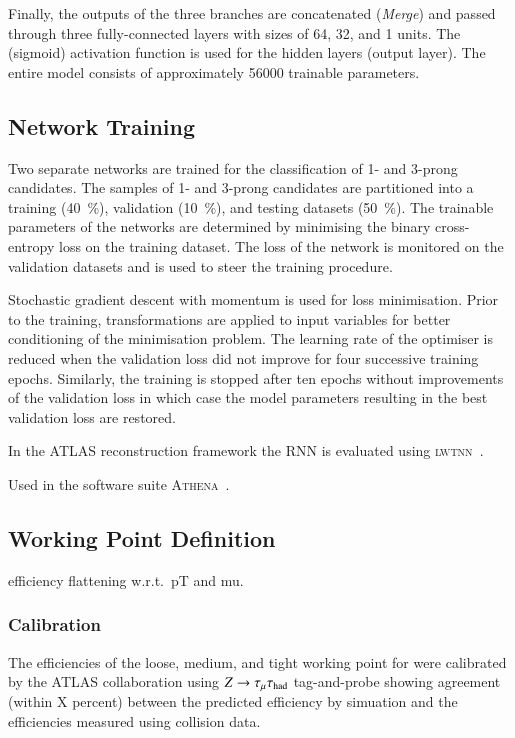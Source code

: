 Finally, the outputs of the three branches are concatenated
(\emph{Merge}) and passed through three fully-connected layers with
sizes of 64, 32, and 1 units. The \ReLU (sigmoid) activation function
is used for the hidden layers (output layer). The entire model
consists of approximately \num{56000} trainable parameters.


\subsection{Network Training}

Two separate networks are trained for the classification of 1- and
3-prong \tauhadvis candidates. The samples of 1- and 3-prong
\tauhadvis candidates are partitioned into a training
(\SI{40}{\percent}), validation (\SI{10}{\percent}), and testing
datasets (\SI{50}{\percent}). The trainable parameters of the networks
are determined by minimising the binary cross-entropy loss on the
training dataset. The loss of the network is monitored on the
validation datasets and is used to steer the training procedure.

Stochastic gradient descent with momentum is used for loss
minimisation. Prior to the training, transformations are applied to
input variables for better conditioning of the minimisation
problem. The learning rate of the optimiser is reduced when the
validation loss did not improve for four successive training
epochs. Similarly, the training is stopped after ten epochs without
improvements of the validation loss in which case the model parameters
resulting in the best validation loss are restored.

In the ATLAS reconstruction framework the RNN \tauid is evaluated
using \textsc{lwtnn}~\cite{lwtnn}.

Used in the software suite
\textsc{Athena}~\cite{ATL-SOFT-PUB-2021-001}.


\subsection{Working Point Definition}

\truetauhadvis efficiency flattening w.r.t.\ pT and mu.


\subsubsection{Calibration}

The efficiencies of the loose, medium, and tight working point for
\truetauhadvis were calibrated by the ATLAS collaboration using
$Z \to \tau_\mu \tau_{\text{had}}$ tag-and-probe showing agreement (within X
percent) between the predicted efficiency by simuation and the
efficiencies measured using collision data.


